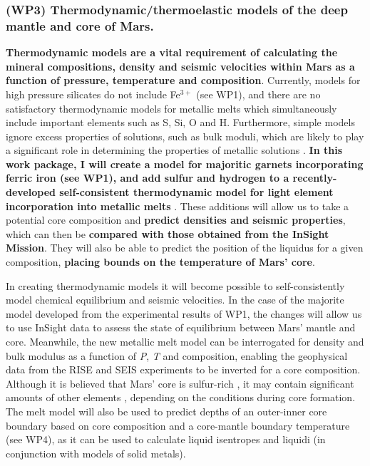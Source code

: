\documentclass[11pt,twoside,a4paper]{article}
\begin{document}
\subsubsection*{(WP3) Thermodynamic/thermoelastic models of the deep mantle and core of Mars.}

\textbf{Thermodynamic models are a vital requirement of calculating the mineral compositions, density and seismic velocities within Mars as a function of pressure, temperature and composition}. Currently, models for high pressure silicates do not include Fe$^{3+}$ (see WP1), and there are no satisfactory thermodynamic models for metallic melts which simultaneously include important elements such as S, Si, O and H. Furthermore, simple models ignore excess properties of solutions, such as bulk moduli, which are likely to play a significant role in determining the properties of metallic solutions \citep{Kom2014,WMSF2015}. \textbf{In this work package, I will create a model for majoritic garnets incorporating ferric iron (see WP1), and add sulfur and hydrogen to a recently-developed self-consistent thermodynamic model for light element incorporation into metallic melts} \citep{MRF2016}. These additions will allow us to take a potential core composition and \textbf{predict densities and seismic properties}, which can then be \textbf{compared with those obtained from the InSight Mission}. They will also be able to predict the position of the liquidus for a given composition, \textbf{placing bounds on the temperature of Mars' core}.

In creating thermodynamic models it will become possible to self-consistently model chemical equilibrium and seismic velocities. In the case of the majorite model developed from the experimental results of WP1, the changes will allow us to use InSight data to assess the state of equilibrium between Mars' mantle and core. Meanwhile, the new metallic melt model can be interrogated for density and bulk modulus as a function of \emph{P}, \emph{T} and composition, enabling the geophysical data from the RISE and SEIS experiments to be inverted for a core composition. Although it is believed that Mars' core is sulfur-rich \citep{WD1994, KC2008}, it may contain significant amounts of other elements \citep{Stevenson2001}, depending on the conditions during core formation. The melt model will also be used to predict depths of an outer-inner core boundary based on core composition and a core-mantle boundary temperature (see WP4), as it can be used to calculate liquid isentropes and liquidi (in conjunction with models of solid metals).
\end{document}
